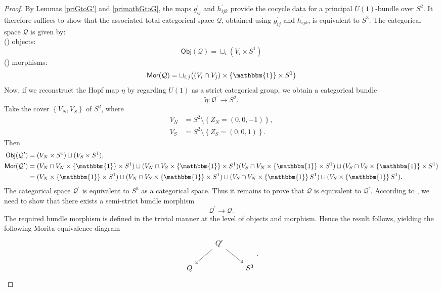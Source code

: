 \documentclass{article}
\theoremstyle{plain}
\theoremstyle{definition}
\newcommand{\rNum}[1]{\lowercase\expandafter{\romannumeral #1\relax}}
\begin{document}
\begin{proof}
By Lemmas \ref{priGtoG'} and \ref{primathGtoG}, the maps $g^\prime_{ij}$ and $h^\prime_{ijk}$ provide the cocycle data for a principal $U(1)$-bundle over $S^2$. It therefore suffices to show that the associated total categorical space $\mathcal{Q}$, obtained using $g^\prime_{ij}$ and $h^\prime_{ijk}$, is equivalent to $S^3$. The categorical space $\mathcal{Q}$ is given by: \\
(\rNum{1}) objects:
\[
\mathsf{Obj}(\mathcal{Q}) = \sqcup_{i} (V_i \times S^1)
\]
(\rNum{2}) morphisms:
\[
\mathsf{Mor}(\mathcal{Q}) = \sqcup_{i,j} \bigl((V_i \cap V_j) \times \left\{\mathbbm{1}\right\} \times S^1\bigr)
\]
Now, if we reconstruct the Hopf map $\eta$ by regarding $U(1)$ as a strict categorical group, we obtain a categorical bundle
$$\widetilde{\eta}:\mathcal{Q}^\prime \longrightarrow S^2.$$
Take the cover $\left\{V_N,V_S\right\}$ of $S^2$, where
\begin{align*}
V_N & = S^2 \setminus \left\{Z_N = (0,0,-1)\right\}, \\
V_S & = S^2 \setminus \left\{Z_S = (0,0,1)\right\}.
\end{align*}
Then
\begin{align*}
\mathsf{Obj}(\mathcal{Q}^\prime) & = (V_N \times S^1) \sqcup (V_S \times S^1),  \\
\mathsf{Mor}(\mathcal{Q}^\prime) & = (V_N \cap V_N \times \left\{\mathbbm{1}\right\} \times S^1) \sqcup (V_N \cap V_S \times \left\{\mathbbm{1}\right\} \times S^1) (V_S \cap V_N \times \left\{\mathbbm{1}\right\} \times S^1) \sqcup (V_S \cap V_S \times \left\{\mathbbm{1}\right\} \times S^1) \\
& = (V_N \times \left\{\mathbbm{1}\right\} \times S^1) \sqcup (V_N \cap V_S \times \left\{\mathbbm{1}\right\} \times S^1) \sqcup (V_S \cap V_N\times \left\{\mathbbm{1}\right\} S^1) \sqcup (V_S \times \left\{\mathbbm{1}\right\} S^1).
\end{align*}
The categorical space $\mathcal{Q}^\prime$ is equivalent to $S^3$ as a categorical space. Thus it remains to prove that $\mathcal{Q}$ is equivalent to $\mathcal{Q}^\prime$. According to \cite[Definition 2.20 on page 589 and Theorem 2.22 on page 590]{MR2805195}, we need to show that there exists a semi-strict bundle morphism
\[
\mathcal{Q}^ \prime \longrightarrow \mathcal{Q}.
\]
The required bundle morphism is defined in the trivial manner at the level of objects and morphism. Hence the result follows, yielding the following Morita equivalence diagram
\[
\begin{tikzcd}
& Q^\prime \arrow[dl] \arrow[dr] & \\
Q & & S^3
\end{tikzcd}.
\]
\end{proof}
\end{document}
